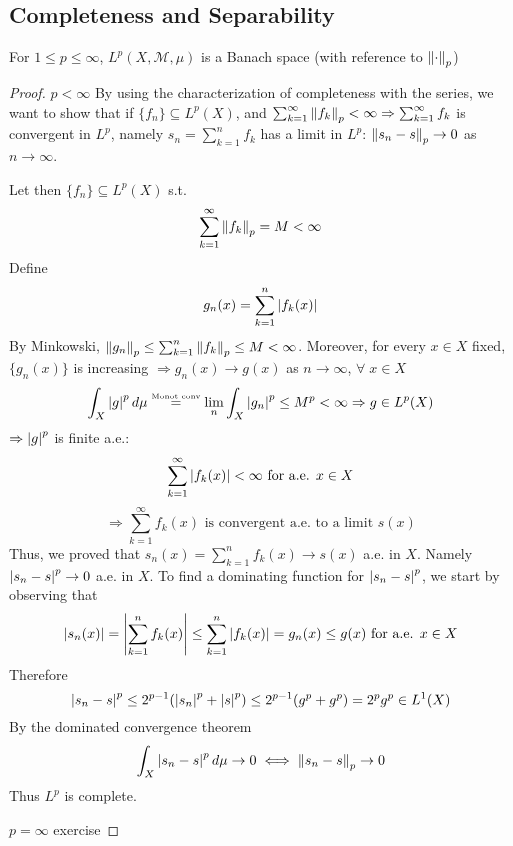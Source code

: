 \subsection*{Completeness and Separability}
\begin{theorem}
    For \(1 \leq p \leq \infty\), \(L^p(X, \mathcal{M}, \mu)\) is a Banach space (with reference to \(\norm{\cdot}_p\))
\end{theorem}
\begin{proof}
    \item \(p < \infty\)
    By using the characterization of completeness with the series, we want to show that 
    if \(\{f_n\} \subseteq L^p(X)\), and \(\sum_{k=1}^\infty\norm{f_k}_p < \infty \Rightarrow \sum_{k=1}^\infty f_k \) is convergent in \(L^p\), 
    namely \(s_n = \sum_{k=1}^n f_k\) has a limit in \(L^p\): \(\norm{s_n -s}_p \to 0 \) as \(n \to \infty\). 

    Let then \(\{f_n\} \subseteq L^p(X)\) s.t. 
    \[
        \sum_{k=1}^\infty \norm{f_k}_p = M < \infty 
    \]
    Define 
    \[
        g_n(x) = \sum_{k=1}^n \abs{f_k(x)}
    \]
    By Minkowski, \(\norm{g_n}_p \leq \sum_{k=1}^n \norm{f_k}_p \leq M < \infty\). 
    Moreover, for every \(x \in X\) fixed, \(\{g_n(x)\}\) is increasing \(\Rightarrow g_n(x) \to g(x)\) as \(n \to \infty\), \(\forall\; x \in X\)
    \[
        \int_X \abs{g}^p \, d\mu \overset{\text{\tiny{Monot conv}}}{=} \lim_n \int_X \abs{g_n}^p \leq M^p < \infty \Rightarrow g \in L^p(X)
    \]
    \(\Rightarrow \abs{g}^p \) is finite a.e.:
    \[
        \sum_{k=1}^\infty \abs{f_k(x)} < \infty \text{  for a.e. } x \in X
    \]
    \[
        \Rightarrow \sum_{k=1}^\infty f_k(x) \text{ is convergent a.e. to a limit } s(x)
    \]
    Thus, we proved that \(s_n(x) = \sum_{k=1}^n f_k(x) \to s(x)\) a.e. in \(X\). Namely \(\abs{s_n - s }^p \to 0\) a.e. in \(X\). To find a dominating function for \(\abs{s_n -s}^p\), we start by observing that
    \[
        \abs{s_n(x)} = \abs{\sum_{k=1}^n f_k(x)} \leq \sum_{k=1}^n \abs{f_k(x)} = g_n(x) \leq g(x) \text{ for a.e. } x \in X
    \]
    Therefore
    \[
        \abs{s_n -s }^p \leq 2^{p-1}(\abs{s_n}^p + \abs{s}^p) \leq 2^{p-1} (g^p + g^p ) = 2^p g^p \in L^1(X)
    \]
    By the dominated convergence theorem
    \[
        \int_X \abs{s_n -s }^p \, d\mu \to 0 \iff \norm{s_n -s}_p \to 0
    \]
    Thus \(L^p\) is complete.
    \item \(p=\infty\) exercise
\end{proof}